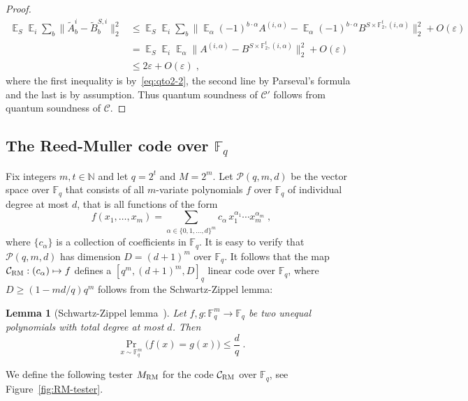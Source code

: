 \documentclass[11pt]{article}
\newtheorem{lemma}[theorem]{Lemma}
\theoremstyle{definition}
\newcommand{\code}{\mathcal{C}}
\DeclareMathOperator*{\Expectation}{\mathbb{E}}
\newcommand{\Es}[1]{\Expectation_{#1}}
\newcommand{\N}{\ensuremath{\mathbb{N}}}
\newcommand{\F}{\ensuremath{\mathbb{F}}}
\newcommand{\mC}{\ensuremath{\mathcal{C}}}
\newcommand{\mP}{\ensuremath{\mathcal{P}}}
\newcommand{\RM}{\ensuremath{\textsc{RM}}}
\newcommand{\eps}{\varepsilon}
\begin{document}
\begin{proof}
\begin{align*}
\Es{S}\Es{i} \sum_b \big\| \tilde{A}^i_b - \tilde{B}^{S,i}_b \big\|_2^2
&\leq \Es{S}\Es{i} \sum_b \Big\| \Es{\alpha} (-1)^{b\cdot \alpha} {A}^{(i,\alpha)} - \Es{\alpha} (-1)^{b\cdot \alpha} B^{S\times \F_2^t,(i,\alpha)}\Big\|_2^2 + O(\eps)\\
&= \Es{S}\Es{i} \Es{\alpha}\big\|  {A}^{(i,\alpha)} -  B^{S\times \F_2^t,(i,\alpha)}\big\|_2^2 + O(\eps)\\
&\leq 2\eps + O(\eps)\;,
\end{align*}
where the first inequality is by~\eqref{eq:qto2-2}, the second line by Parseval's formula and the last is by assumption. Thus quantum soundness of $\code'$ follows from quantum soundness of $\code$. 
\end{proof}






\subsection{The Reed-Muller code over $\F_q$}

Fix integers $m,t \in \N$ and let $q=2^t$ and $M = 2^m$. Let $\mP(q,m,d)$ be the vector space over $\F_q$ that consists of all $m$-variate polynomials $f$ over $\F_q$ of individual degree at most $d$, that is all functions of the form
\[
	f(x_1,\ldots,x_m) = \sum_{\alpha \in \{0,1,\ldots,d\}^m} c_\alpha\,
  x_1^{\alpha_1} \cdots x_m^{\alpha_m}\;,
\]
where $\{c_\alpha\}$ is a collection of coefficients in $\F_q$. It is easy to verify that $\mP(q,m,d)$ has dimension $D = (d+1)^m$ over $\F_q$. It follows that the map $\mC_\RM: (c_\alpha) \mapsto f$ defines a $[q^m,(d+1)^m,D]_q$ linear code over $\F_q$, where $D\geq (1-md/q)q^m$ follows from the Schwartz-Zippel lemma: 

\begin{lemma}[Schwartz-Zippel lemma~\cite{Sch80,Zip79}]
  \label{lem:schwartz-zippel}
  Let $f, g: \F_q^m \to \F_q$ be two unequal polynomials with total degree at most $d$. Then
  \begin{equation*}
    \Pr_{x \sim \F_q^m}\big(f(x) = g(x)\big) \leq \frac{d}{q}\;.
  \end{equation*}
\end{lemma}


We define the following tester $M_{\RM}$ for the code $\mC_\RM$ over $\F_q$, see Figure~\ref{fig:RM-tester}. 
\end{document}
